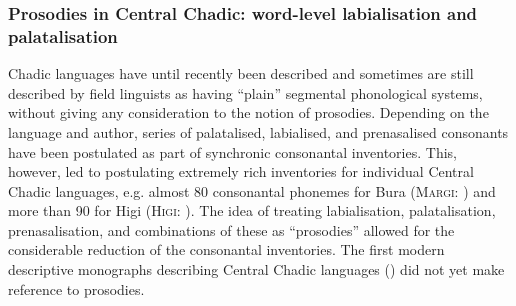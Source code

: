 \documentclass[output=paper]{langscibook}
\begin{document}
\subsubsection{Prosodies in Central Chadic: word-level labialisation and palatalisation} 
\label{sec:Wolff:1.4.5}
\largerpage
Chadic languages have until recently been described and sometimes are still described by field linguists as having ``plain'' segmental phonological systems, without giving any consideration to the notion of prosodies. Depending on the language and author, series of palatalised, labialised, and prenasalised consonants have been postulated as part of synchronic consonantal inventories. This, however, led to postulating extremely rich inventories for individual Central Chadic languages, e.g. almost 80 consonantal phonemes for Bura (\textsc{Margi:} \citealt{Hoffmann1987}) and more than 90 for Higi (\textsc{Higi:} \citealt{Barreteau1983}). The idea of treating labialisation, palatalisation, prenasalisation, and combinations of these as ``prosodies'' allowed for the considerable reduction of the consonantal inventories. The first modern descriptive monographs describing Central Chadic languages (\citealt{Hoffmann1963, Newman1970, Wolff1983b}) did not yet make reference to prosodies.
\end{document}

